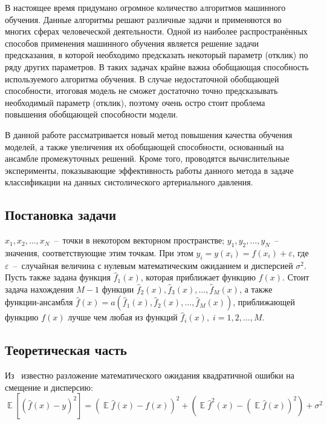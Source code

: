 \documentclass[12pt, fleqn]{article}
\newcommand{\expectation}{\mathop{\mathbb{E}}}
\newcommand{\predictionfunction}{\hat{f}}
\newcommand{\ensemblefunction}{a}
\newcommand{\numberobjects}{N}
\newcommand{\numberpredictionfunctions}{M}
\newcommand{\many}[3]{#1 1 #2, #1 2 #2, \dots, #1 #3 #2}  %
\newcommand{\ensemblefunctionfull}{\ensemblefunction(\many{\predictionfunction_}{(x)}{\numberpredictionfunctions})}
\begin{document}
В настоящее время придумано огромное количество алгоритмов машинного обучения. Данные алгоритмы решают различные задачи и применяются во многих сферах человеческой деятельности. Одной из наиболее распространённых способов применения машинного обучения является решение задачи предсказания, в которой необходимо предсказать некоторый параметр (отклик) по ряду других параметров. В таких задачах крайне важна обобщающая способность используемого алгоритма обучения. В случае недостаточной обобщающей способности, итоговая модель не сможет достаточно точно предсказывать необходимый параметр (отклик), поэтому очень остро стоит проблема повышения обобщающей способности модели.

В данной работе рассматривается новый метод повышения качества обучения моделей, а также увеличения их обобщающей способности, основанный на ансамбле промежуточных решений. Кроме того, проводятся вычислительные эксперименты, показывающие эффективность работы данного метода в задаче классификации на данных систолического артериального давления.

\subsection{Постановка задачи}

$\many{x_}{}{\numberobjects}$~--~точки в некотором векторном пространстве; $\many{y_}{}{\numberobjects}$~--~ значения, соответствующие этим точкам. При этом $y_i = y(x_i) = f(x_i) + \varepsilon$, где $\varepsilon$~--~случайная величина с нулевым математическим ожиданием и дисперсией $\sigma^2$. Пусть также задана функция $\predictionfunction_1(x)$, которая приближает функцию $f(x)$. Стоит задача нахождения $\numberpredictionfunctions - 1$ функции $\predictionfunction_2(x), \predictionfunction_3(x), \dots, \predictionfunction_\numberpredictionfunctions(x)$, а также функции-ансамбля $\predictionfunction(x) = \ensemblefunctionfull$, приближающей функцию $f(x)$ лучше чем любая из функций $\predictionfunction_i(x), \; i = \many{}{}{\numberpredictionfunctions}$.

\subsection{Теоретическая часть}
Из~\cite{BiasVarianceDecompositionZeroOneSquaredLoss} известно разложение математического ожидания квадратичной ошибки на смещение и дисперсию:
\begin{equation*}
\expectation \left[ \left( \predictionfunction(x) - y \right)^2 \right] =
\left(
	\expectation \predictionfunction(x) - f(x)
\right)^2  +
\left(
	\expectation \predictionfunction^2(x) - \left(\expectation \predictionfunction(x)\right)^2
\right) + \sigma^2
\end{equation*}
\end{document}
